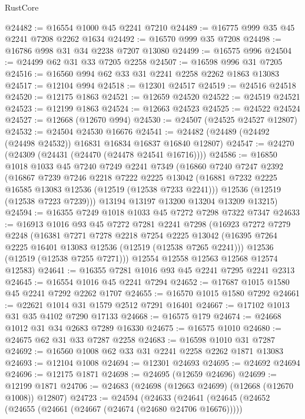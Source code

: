 \begin{lexlean}{RustCore}
\begin{coremodule}
@24482 := @16554 @1000 @45 @2241 @7210
@24489 := @16775 @999 @35 @45 @2241 @7208 @2262 @1634
@24492 := @16570 @999 @35 @7208
@24498 := @16786 @998 @31 @34 @2238 @7207 @13080
@24499 := @16575 @996
@24504 := @24499 @62 @31 @33 @7205 @2258
@24507 := @16598 @996 @31 @7205
@24516 := @16560 @994 @62 @33 @31 @2241 @2258 @2262 @1863 @13083
@24517 := @12104 @994
@24518 := @12301 @24517
@24519 := @24516 @24518
@24520 := @12175 @1863
@24521 := @12659 @24520
@24522 := @24519 @24521
@24523 := @12199 @1863
@24524 := @12663 @24523
@24525 := @24522 @24524
@24527 := @12668 (@12670 @994)
@24530 := @24507 (@24525 @24527 @12807)
@24532 := @24504 @24530 @16676
@24541 := @24482 (@24489 (@24492 (@24498 @24532)) @16831 @16834 @16837 @16840 @12807)
@24547 := @24270 (@24309 (@24431 (@24470 (@24478 @24541 @16716))))
@24586 := @16850
    @1018
    @1033
    @45
    @7240
    @7249
    @2241
    @7349
    (@16860
      @7240
      @7247
      @2392
      (@16867
        @7239
        @7246
        @2218
        @7222
        @2225
        @13042
        (@16881 @7232 @2225 @16585 @13083 @12536 (@12519 (@12538 @7233 @2241)))
        @12536
        (@12519 (@12538 @7223 @7239)))
      @13194
      @13197
      @13200
      @13204
      @13209
      @13215)
@24594 := @16355 @7249 @1018 @1033 @45 @7272 @7298 @7322 @7347
@24633 := @16913
    @1016
    @93
    @45
    @7272
    @7281
    @2241
    @7298
    (@16923
      @7272
      @7279
      @2248
      (@16381
        @7271
        @7278
        @2218
        @7254
        @2225
        @13042
        (@16395 @7264 @2225 @16401 @13083 @12536 (@12519 (@12538 @7265 @2241)))
        @12536
        (@12519 (@12538 @7255 @7271)))
      @12554
      @12558
      @12563
      @12568
      @12574
      @12583)
@24641 := @16355 @7281 @1016 @93 @45 @2241 @7295 @2241 @2313
@24645 := @16554 @1016 @45 @2241 @7294
@24652 := @17687 @1015 @1580 @45 @2241 @7292 @2262 @1707
@24655 := @16570 @1015 @1580 @7292
@24661 := @22621 @1014 @31 @1579 @2512 @7291 @16401
@24667 := @17102 @1013 @31 @35 @4102 @7290 @17133
@24668 := @16575 @179
@24674 := @24668 @1012 @31 @34 @2683 @7289 @16330
@24675 := @16575 @1010
@24680 := @24675 @62 @31 @33 @7287 @2258
@24683 := @16598 @1010 @31 @7287
@24692 := @16560 @1008 @62 @33 @31 @2241 @2258 @2262 @1871 @13083
@24693 := @12104 @1008
@24694 := @12301 @24693
@24695 := @24692 @24694
@24696 := @12175 @1871
@24698 := @24695 (@12659 @24696)
@24699 := @12199 @1871
@24706 := @24683 (@24698 (@12663 @24699) (@12668 (@12670 @1008)) @12807)
@24723 := @24594
    (@24633
      (@24641
        (@24645
          (@24652
            (@24655 (@24661 (@24667 (@24674 (@24680 @24706 @16676)))))

\end{coremodule}
\end{lexlean}
